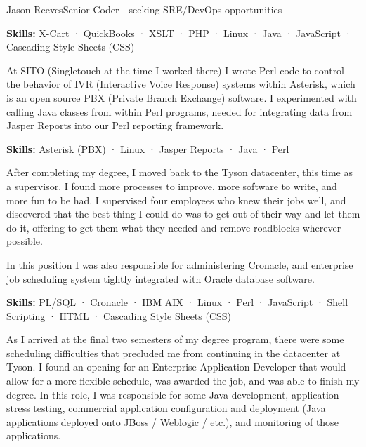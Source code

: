 \documentclass{article}
\begin{document}
\begin{cv}[avatar]{Jason Reeves}{Senior Coder - seeking SRE/DevOps opportunities}
\begin{cvevent}[Feb 2009][Jul 2011]
  \vspace*{3mm}
  \textbf{Skills:} X-Cart · QuickBooks · XSLT · PHP · Linux · Java · JavaScript · Cascading Style Sheets (CSS)
  \vspace*{5mm}
\end{cvevent}

\begin{cvevent}[Sep 2007][Feb 2009]
  At SITO (Singletouch at the time I worked there) I wrote Perl code to control the behavior of IVR (Interactive Voice Response) systems within Asterisk, which is an open source PBX (Private Branch Exchange) software. I experimented with calling Java classes from within Perl programs, needed for integrating data from Jasper Reports into our Perl reporting framework.
  
  \vspace*{3mm}
  \textbf{Skills:} Asterisk (PBX) · Linux · Jasper Reports · Java · Perl
  \vspace*{5mm}
\end{cvevent}

\begin{cvevent}[Sep 2005][Sep 2007]
  After completing my degree, I moved back to the Tyson datacenter, this time as a supervisor. I found more processes to improve, more software to write, and more fun to be had. I supervised four employees who knew their jobs well, and discovered that the best thing I could do was to get out of their way and let them do it, offering to get them what they needed and remove roadblocks wherever possible.
  \vspace*{3mm}
  
  In this position I was also responsible for administering Cronacle, and enterprise job scheduling system tightly integrated with Oracle database software.
  \vspace*{3mm}
  
  \textbf{Skills:} PL/SQL · Cronacle · IBM AIX · Linux · Perl · JavaScript · Shell Scripting · HTML · Cascading Style Sheets (CSS)
  \vspace*{5mm}
\end{cvevent}

\begin{cvevent}[Sep 2004][Sep 2005]
  As I arrived at the final two semesters of my degree program, there were some scheduling difficulties that precluded me from continuing in the datacenter at Tyson. I found an opening for an Enterprise Application Developer that would allow for a more flexible schedule, was awarded the job, and was able to finish my degree. In this role, I was responsible for some Java development, application stress testing, commercial application configuration and deployment (Java applications deployed onto JBoss / Weblogic / etc.), and monitoring of those applications.
  \vspace*{3mm}
  

\end{cvevent}
\end{cv}
\end{document}
